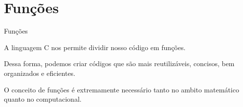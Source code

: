 \section{Funções}

\begin{slide}{Funções}

    \item A linguagem C nos permite dividir nosso código em funções.

    \item Dessa forma, podemos criar códigos que são mais reutilizáveis, concisos, bem organizados e eficientes.

    \item O conceito de funções é extremamente necessário tanto no ambito matemático quanto no computacional.

\end{slide}
    